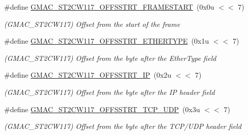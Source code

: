 \begin{DoxyCompactItemize}
\item 
\mbox{\label{group__SAME70__GMAC_gad6b8b0c894711341bd39117f09da675e}} 
\#define \mbox{\hyperlink{group__SAME70__GMAC_gad6b8b0c894711341bd39117f09da675e}{G\+M\+A\+C\+\_\+\+S\+T2\+C\+W117\+\_\+\+O\+F\+F\+S\+S\+T\+R\+T\+\_\+\+F\+R\+A\+M\+E\+S\+T\+A\+RT}}~(0x0u $<$$<$ 7)
\begin{DoxyCompactList}\small\item\em (G\+M\+A\+C\+\_\+\+S\+T2\+C\+W117) Offset from the start of the frame \end{DoxyCompactList}\item 
\mbox{\label{group__SAME70__GMAC_ga32eb01278d551dedcd8d863ff872f166}} 
\#define \mbox{\hyperlink{group__SAME70__GMAC_ga32eb01278d551dedcd8d863ff872f166}{G\+M\+A\+C\+\_\+\+S\+T2\+C\+W117\+\_\+\+O\+F\+F\+S\+S\+T\+R\+T\+\_\+\+E\+T\+H\+E\+R\+T\+Y\+PE}}~(0x1u $<$$<$ 7)
\begin{DoxyCompactList}\small\item\em (G\+M\+A\+C\+\_\+\+S\+T2\+C\+W117) Offset from the byte after the Ether\+Type field \end{DoxyCompactList}\item 
\mbox{\label{group__SAME70__GMAC_ga27877fc6453f2b750a5c00a7b8730232}} 
\#define \mbox{\hyperlink{group__SAME70__GMAC_ga27877fc6453f2b750a5c00a7b8730232}{G\+M\+A\+C\+\_\+\+S\+T2\+C\+W117\+\_\+\+O\+F\+F\+S\+S\+T\+R\+T\+\_\+\+IP}}~(0x2u $<$$<$ 7)
\begin{DoxyCompactList}\small\item\em (G\+M\+A\+C\+\_\+\+S\+T2\+C\+W117) Offset from the byte after the IP header field \end{DoxyCompactList}\item 
\mbox{\label{group__SAME70__GMAC_ga64b6cb6108a10cbc1b13e59140bd5af7}} 
\#define \mbox{\hyperlink{group__SAME70__GMAC_ga64b6cb6108a10cbc1b13e59140bd5af7}{G\+M\+A\+C\+\_\+\+S\+T2\+C\+W117\+\_\+\+O\+F\+F\+S\+S\+T\+R\+T\+\_\+\+T\+C\+P\+\_\+\+U\+DP}}~(0x3u $<$$<$ 7)
\begin{DoxyCompactList}\small\item\em (G\+M\+A\+C\+\_\+\+S\+T2\+C\+W117) Offset from the byte after the T\+C\+P/\+U\+DP header field \end{DoxyCompactList}\item 
\mbox{\label{group__SAME70__GMAC_ga75c5826888017cd1d85bec4c8dc2b1bc}} 

\end{DoxyCompactItemize}
